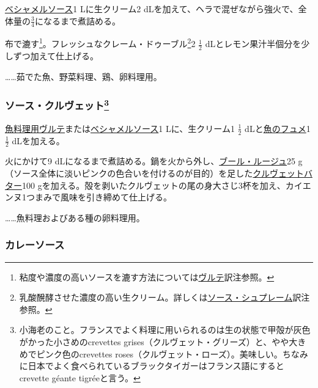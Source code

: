 \begin{recette}
\protect\hyperlink{sauce-bechamel}{ベシャメルソース}1 Lに生クリーム2
dLを加えて、ヘラで混ぜながら強火で、全体量の\(\frac{3}{4}\)になるまで煮詰める。

布で漉す\footnote{粘度や濃度の高いソースを漉す方法については\protect\hyperlink{veloute}{ヴルテ}訳注参照。}。フレッシュなクレーム・ドゥーブル\footnote{乳酸醗酵させた濃度の高い生クリーム。詳しくは\protect\hyperlink{sauce-supreme}{ソース・シュプレーム}訳注参照。}2
\(\frac{1}{2}\) dLとレモン果汁半個分を少しずつ加えて仕上げる。

\ldots{}\ldots{}茹でた魚、野菜料理、鶏、卵料理用。

\atoaki{}

\hypertarget{sauce-aux-crevettes}{%
\subsubsection[ソース・クルヴェット]{\texorpdfstring{ソース・クルヴェット\footnote{小海老のこと。フランスでよく料理に用いられるのは生の状態で甲殻が灰色がかった小さめのcrevettes
  grises（クルヴェット・グリーズ）と、やや大きめでピンク色のcrevettes
  roses（クルヴェット・ローズ）。美味しい。ちなみに日本でよく食べられているブラックタイガーはフランス語にするとcrevette
  géante tigréeと言う。}}{ソース・クルヴェット}}\label{sauce-aux-crevettes}}



\protect\hyperlink{veloute-de-poisson}{魚料理用ヴルテ}または\protect\hyperlink{sauce-bechamel}{ベシャメルソース}1
Lに、生クリーム1 \(\frac{1}{2}\)
dLと\protect\hyperlink{fumet-de-poisson}{魚のフュメ}1 \(\frac{1}{2}\)
dLを加える。

火にかけて9
dLになるまで煮詰める。鍋を火から外し、\protect\hyperlink{}{ブール・ルージュ}25
g（ソース全体に淡いピンクの色合いを付けるのが目的）を足した\protect\hyperlink{}{クルヴェットバター}100
gを加える。殻を剥いたクルヴェットの尾の身大さじ3杯を加え、カイエンヌ1つまみで風味を引き締めて仕上げる。

\ldots{}\ldots{}魚料理およびある種の卵料理用。

\atoaki{}

\hypertarget{sauce-currie}{%
\subsubsection{カレーソース}\label{sauce-currie}}


\end{recette}
